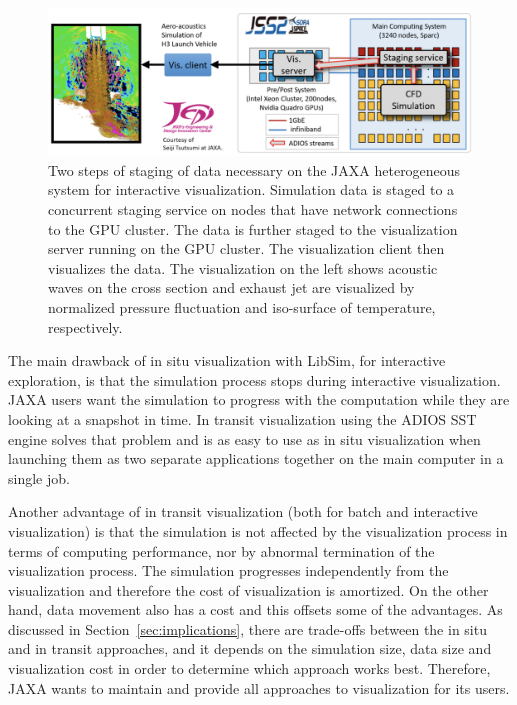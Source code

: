 \begin{figure}[b]
\includegraphics[width=1\linewidth]{figures/JAXA.png}
\caption{Two steps of staging of data necessary on the JAXA heterogeneous system for interactive visualization. Simulation data is staged to a concurrent staging service on nodes that have network connections to the GPU cluster. The data is further staged to the visualization server running on the GPU cluster. The visualization client then visualizes the data. The visualization on the left shows acoustic waves on the cross section and exhaust jet are visualized by normalized pressure fluctuation and iso-surface of temperature, respectively.}
\label{fig:insituJAXA_arch}
\end{figure}

The main drawback of in situ visualization with LibSim, for interactive exploration, is that the simulation process stops during interactive visualization. JAXA users want the simulation to progress with the computation while they are looking at a snapshot in time. In transit visualization using the ADIOS SST engine solves that problem and is as easy to use as in situ visualization when launching them as two separate applications together on the main computer in a single job.

Another advantage of in transit visualization (both for batch and interactive visualization) is that the simulation is not affected by the visualization process in terms of computing performance, nor by abnormal termination of the visualization process. The simulation progresses independently from the visualization and therefore the cost of visualization is amortized. On the other hand, data movement also has a cost and this offsets some of the advantages. 
As discussed in Section~\ref{sec:implications}, there are trade-offs between the in situ and in transit approaches, and it depends on the simulation size, data size and visualization cost in order to determine which approach works best. Therefore, JAXA wants to maintain and provide all approaches to visualization for its users. 

